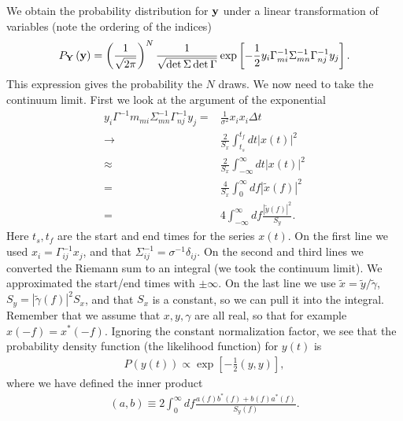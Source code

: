 We obtain the probability distribution for ${\bf y}$ under a linear transformation
of variables
(note the ordering of the indices)
\begin{align}
    P_{\bf Y}\left({\bf y}\right)
    =
    \left(\frac{1}{\sqrt{2\pi}}\right)^N
    \frac{1}{\sqrt{\det{\Sigma}\det{\Gamma}}}
    \exp\left[-\frac{1}{2}y_i\Gamma_{mi}^{-1}\Sigma^{-1}_{mn}\Gamma^{-1}_{nj}y_j\right]
    .
\end{align}
This expression gives the probability the $N$ draws.
We now need to take the continuum limit.
First we look at the argument of the exponential  
\begin{align}
    y_i\Gamma^{-1}m_{mi}\Sigma^{-1}_{mn}\Gamma^{-1}_{nj}y_j
    =&
    \frac{1}{\sigma^2}x_ix_i \Delta t
    \nonumber\\
    \to&
    \frac{2}{S_x} \int_{t_s}^{t_f}dt \left|x\left(t\right)\right|^2
    \nonumber\\
    \approx&
    \frac{2}{S_x} \int_{-\infty}^{\infty}dt \left|x\left(t\right)\right|^2
    \nonumber\\
    =&
    \frac{4}{S_x} \int_0^{\infty}df \left|\tilde{x}\left(f\right)\right|^2
    \nonumber\\
    =&
    4\int_{-\infty}^{\infty}df 
        \frac{\left|\tilde{y}\left(f\right)\right|^2}{S_y}
    .
\end{align}
Here $t_s,t_f$ are the start and end times for the series $x(t)$.
On the first line we used $x_i = \Gamma^{-1}_{ij}x_j$, and that
$\Sigma_{ij}^{-1} = \sigma^{-1}\delta_{ij}$.
On the second and third lines we converted the Riemann sum to an
integral (we took the continuum limit).
We approximated the start/end times with $\pm\infty$.
On the last line we use $\tilde{x}=\tilde{y}/\tilde{\gamma}$, 
$S_y= \left|\tilde{\gamma}\left(f\right)\right|^2S_x$, and that
$S_x$ is a constant, so we can pull it into the integral.
Remember that we assume that $x,y,\gamma$ are all real, so that for example
$x\left(-f\right)=x^*\left(-f\right)$.
Ignoring the constant normalization factor, we see that the probability density
function (the likelihood function) for $y\left(t\right)$ is
\begin{align}
    \label{eq:likelihood-function-colored-noise}
    P\left(y\left(t\right)\right)
    \propto
    \exp\left[-\frac{1}{2}\left(y,y\right)\right]
    ,
\end{align}
where we have defined the inner product
\begin{align}
    \label{eq:inner-product-matched-filter}
    \left(a,b\right)
    \equiv
    2 \int_0^{\infty}df
        \frac{
            a\left(f\right)b^*\left(f\right)
            +
            b\left(f\right)a^*\left(f\right)
        }{
            S_y\left(f\right)
        }
        .
\end{align}
